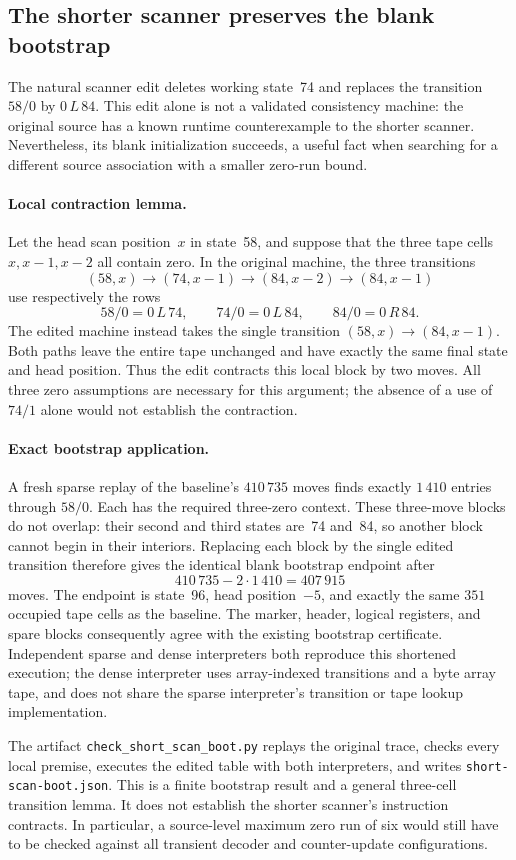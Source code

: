 \subsection{The shorter scanner preserves the blank bootstrap}
\label{sec:short-scan-boot}
The natural scanner edit deletes working state~74 and replaces the transition
$58/0$ by $0\,L\,84$.  This edit alone is not a validated consistency machine:
the original source has a known runtime counterexample to the shorter scanner.
Nevertheless, its blank initialization succeeds, a useful fact when searching
for a different source association with a smaller zero-run bound.

\paragraph{Local contraction lemma.}
Let the head scan position~$x$ in state~58, and suppose that the three tape
cells $x,x-1,x-2$ all contain zero.  In the original machine, the three
transitions
\[
 (58,x)\longrightarrow(74,x-1)\longrightarrow(84,x-2)
       \longrightarrow(84,x-1)
\]
use respectively the rows
\[
 58/0=0\,L\,74,\qquad
 74/0=0\,L\,84,\qquad
 84/0=0\,R\,84.
\]
The edited machine instead takes the single transition
$(58,x)\longrightarrow(84,x-1)$.
Both paths leave the entire tape unchanged and have exactly the same final
state and head position.  Thus the edit contracts this local block by two
moves.  All three zero assumptions are necessary for this argument; the
absence of a use of $74/1$ alone would not establish the contraction.

\paragraph{Exact bootstrap application.}
A fresh sparse replay of the baseline's $410\,735$ moves finds exactly
$1\,410$ entries through $58/0$.  Each has the required three-zero context.
These three-move blocks do not overlap: their second and third states are~74
and~84, so another block cannot begin in their interiors.  Replacing each
block by the single edited transition therefore gives the identical blank
bootstrap endpoint after
\[
 410\,735-2\cdot1\,410=407\,915
\]
moves.  The endpoint is state~96, head position~$-5$, and exactly the same
$351$ occupied tape cells as the baseline.  The marker, header, logical
registers, and spare blocks consequently agree with the existing bootstrap
certificate.  Independent sparse and dense interpreters both reproduce this
shortened execution; the dense interpreter uses array-indexed transitions and
a byte array tape, and does not share the sparse interpreter's transition or
tape lookup implementation.

The artifact \texttt{check\_short\_scan\_boot.py} replays the original trace,
checks every local premise, executes the edited table with both interpreters,
and writes \texttt{short-scan-boot.json}.  This is a finite bootstrap result
and a general three-cell transition lemma.  It does not establish the shorter
scanner's instruction contracts.  In particular, a source-level maximum zero
run of six would still have to be checked against all transient decoder and
counter-update configurations.
